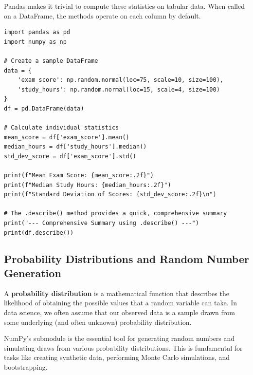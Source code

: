 \begin{example}
Pandas makes it trivial to compute these statistics on tabular data. When called on a DataFrame, the methods operate on each column by default.
\text{ }\begin{verbatim}
import pandas as pd
import numpy as np

# Create a sample DataFrame
data = {
    'exam_score': np.random.normal(loc=75, scale=10, size=100),
    'study_hours': np.random.normal(loc=15, scale=4, size=100)
}
df = pd.DataFrame(data)

# Calculate individual statistics
mean_score = df['exam_score'].mean()
median_hours = df['study_hours'].median()
std_dev_score = df['exam_score'].std()

print(f"Mean Exam Score: {mean_score:.2f}")
print(f"Median Study Hours: {median_hours:.2f}")
print(f"Standard Deviation of Scores: {std_dev_score:.2f}\n")

# The .describe() method provides a quick, comprehensive summary
print("--- Comprehensive Summary using .describe() ---")
print(df.describe())
\end{verbatim}
\end{example}

\subsection{Probability Distributions and Random Number Generation}
\label{subsec:distributions_rng}
A \textbf{probability distribution} is a mathematical function that describes the likelihood of obtaining the possible values that a random variable can take. In data science, we often assume that our observed data is a sample drawn from some underlying (and often unknown) probability distribution.

NumPy's  submodule is the essential tool for generating random numbers and simulating draws from various probability distributions. This is fundamental for tasks like creating synthetic data, performing Monte Carlo simulations, and bootstrapping.

